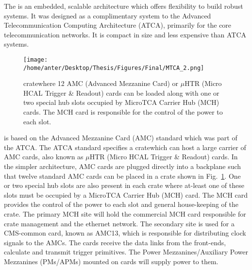 The \mtca is an embedded, scalable architecture which offers flexibility to build robust systems. It was designed as a complimentary system to the Advanced Telecommunication Computing Architecture (ATCA), primarily for the core telecommunication networks. It is compact in size and less expensive than ATCA systems.\begin{figure}[!h]
\begin{center}
\vspace*{3mm}
\hspace*{-5mm}
\texttt{[image: /home/anter/Desktop/Thesis/Figures/Final/MTCA\_2.png]}\\
\vspace*{4mm}
\caption[\mtca crate showing the different slots.]{\mtca crate\footnotemark where 12 AMC (Advanced Mezzanine Card) or $\mu$HTR (Micro HCAL Trigger \& Readout) cards can be loaded along with one or two special hub slots occupied by MicroTCA Carrier Hub (MCH) cards. The MCH card is responsible for the control of the power to each slot.}
\label{fig:MTCA}
\end{center}
\end{figure} \mtca is based on the Advanced Mezzanine Card (AMC) standard which was part of the ATCA. The ATCA standard specifies a cratewhich can host a large carrier of AMC cards, also known as $\mu$HTR (Micro HCAL Trigger \& Readout) cards. In the simpler \mtca architecture, AMC cards are plugged directly into a backplane such that twelve standard AMC cards can be placed in a crate shown in Fig.~\ref{fig:MTCA}. One or two special hub slots are also present in each crate where at-least one of these slots must be occupied by a MicroTCA Carrier Hub (MCH) card. The MCH card provides the control of the power to each slot and general house-keeping of the crate. The primary MCH site will hold the commercial MCH card responsible for crate management and the ethernet network. The secondary site is used for a CMS-common card, known as AMC13, which is responsible for distributing clock signals to the AMCs. The \mhtr cards receive the data links from the front-ends, calculate and transmit trigger primitives. The Power Mezzanines/Auxiliary Power Mezzanines (PMs/APMs) mounted on \mhtr cards will supply power to them. 

